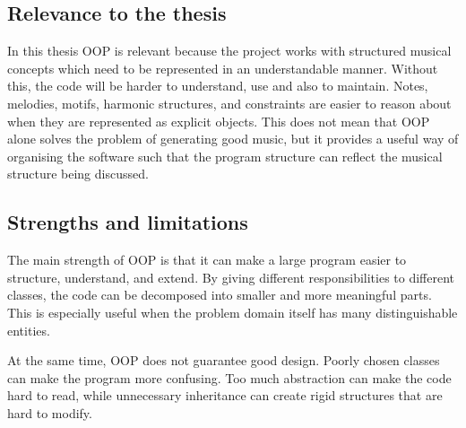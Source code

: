 \subsection{Relevance to the thesis}

  In this thesis \ac{OOP} is relevant because the project works with structured musical concepts which need to be represented in an understandable manner. Without this, the code will be harder to understand, use and also to maintain. Notes, melodies, motifs, harmonic structures, and constraints are easier to reason about when they are represented as explicit objects. This does not mean that \ac{OOP} alone solves the problem of generating good music, but it provides a useful way of organising the software such that the program structure can reflect the musical structure being discussed.


\subsection{Strengths and limitations}

  The main strength of \ac{OOP} is that it can make a large program easier to structure, understand, and extend. By giving different responsibilities to different classes, the code can be decomposed into smaller and more meaningful parts. This is especially useful when the problem domain itself has many distinguishable entities.

  At the same time, \ac{OOP} does not guarantee good design. Poorly chosen classes can make the program more confusing. Too much abstraction can make the code hard to read, while unnecessary inheritance can create rigid structures that are hard to modify.
